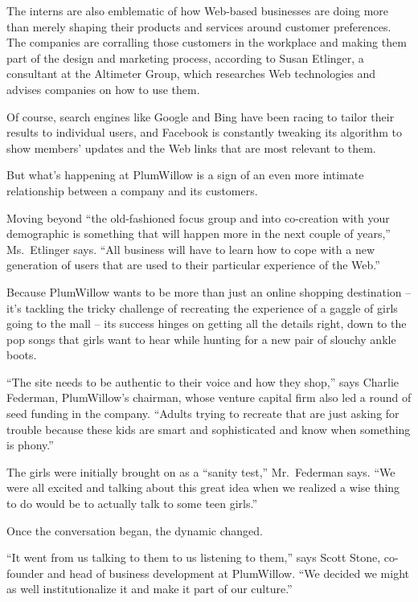 ﻿\documentclass[12pt]{article}
\begin{document}
The interns are also emblematic of how Web-based businesses are doing more than merely shaping their
products and services around customer preferences. The companies are corralling those customers in
the workplace and making them part of the design and marketing process, according to Susan Etlinger,
a consultant at the Altimeter Group, which researches Web technologies and advises companies on how
to use them.

Of course, search engines like Google and Bing have been racing to tailor their results to
individual users, and Facebook is constantly tweaking its algorithm to show members' updates and the
Web links that are most relevant to them.

But what's happening at PlumWillow is a sign of an even more intimate relationship between a company
and its customers.

Moving beyond ``the old-fashioned focus group and into co-creation with your demographic is
something that will happen more in the next couple of years,'' Ms.~Etlinger says. ``All business
will have to learn how to cope with a new generation of users that are used to their particular
experience of the Web.''

Because PlumWillow wants to be more than just an online shopping destination -- it's tackling the
tricky challenge of recreating the experience of a gaggle of girls going to the mall -- its success
hinges on getting all the details right, down to the pop songs that girls want to hear while hunting
for a new pair of slouchy ankle boots.

``The site needs to be authentic to their voice and how they shop,'' says Charlie Federman,
PlumWillow's chairman, whose venture capital firm also led a round of seed funding in the company.
``Adults trying to recreate that are just asking for trouble because these kids are smart and
sophisticated and know when something is phony.''

The girls were initially brought on as a ``sanity test,'' Mr.~Federman says. ``We were all excited
and talking about this great idea when we realized a wise thing to do would be to actually talk to
some teen girls.''

Once the conversation began, the dynamic changed.

``It went from us talking to them to us listening to them,'' says Scott Stone, co-founder and head
of business development at PlumWillow. ``We decided we might as well institutionalize it and make it
part of our culture.''
\end{document}
